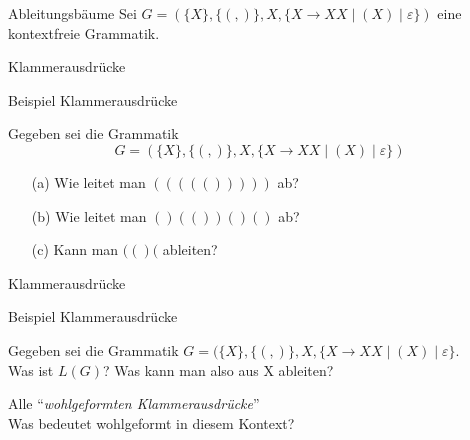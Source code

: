 \begin{frame}{Ableitungsbäume}
	Sei $G = (\{X\}, \{(, )\}, X, \{X \to XX \mid (X) \mid \varepsilon\})$ eine kontextfreie Grammatik. \linebreak[3]
	\pause
\end{frame}

\begin{frame}{Klammerausdrücke}
	\begin{exampleblock}{Beispiel Klammerausdrücke}
		
	Gegeben sei die Grammatik $$G = (\{X\}, \{(, )\}, X, \{X \to XX \mid (X) \mid \varepsilon\})$$
	\begin{itemize}
		\item[(a)] Wie leitet man $((((()))))$ ab?
		\item[(b)] Wie leitet man $()(())()()$ ab?
		\item[(c)] Kann man $(()($ ableiten?
	\end{itemize}
	\end{exampleblock}
\end{frame}

\begin{frame}{Klammerausdrücke}

	\begin{exampleblock}{Beispiel Klammerausdrücke}
		

		Gegeben sei die Grammatik $G = (\{X\}, \{(, )\}, X, \{X \to XX \mid (X) \mid \varepsilon\}$.\\
		Was ist $L(G)$? Was kann man also aus X ableiten?\linebreak[3] \pause 

		Alle \enquote{\textit{wohlgeformten Klammerausdrücke}}\\[1em]
		Was bedeutet wohlgeformt in diesem Kontext?
	\end{exampleblock}

\end{frame}

